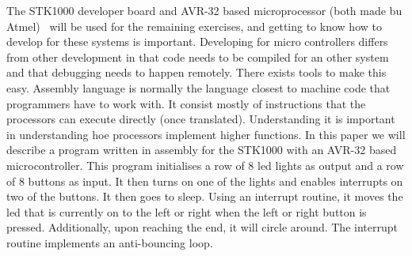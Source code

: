 The STK1000 developer board and AVR-32 based microprocessor (both made bu Atmel)  will be used for the remaining exercises, and getting to know how to develop for these systems is important. Developing for micro controllers differs from other development in that code needs to be compiled for an other system and that debugging needs to happen remotely. There exists tools to make this easy.
Assembly language is normally the language closest to machine code that programmers have to work with. It consist mostly of instructions that the processors can execute directly (once translated). Understanding it is important in understanding hoe processors implement higher functions.
In this paper we will describe a program written in assembly for the STK1000 with an AVR-32 based microcontroller. This program initialises a row of 8 led lights as output and a row of 8 buttons as input. It then turns on one of the lights and enables interrupts on two of the buttons. It then goes to sleep. Using an interrupt routine, it moves the led that is currently on to the left or right when the left or right button is pressed. Additionally, upon reaching the end, it will circle around. The interrupt routine implements an anti-bouncing loop.

